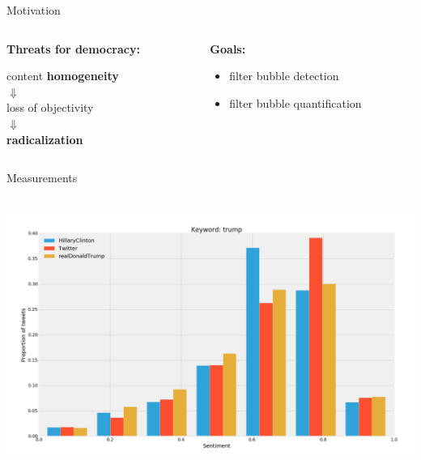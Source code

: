 \documentclass{beamer}
\begin{document}
\begin{frame}[fragile]
\begin{columns}[T]
\begin{column}{.63\textwidth}
\begin{customalertblock}{Motivation}
    \begin{columns}
        \begin{column}{.5\textwidth}
            \begin{large}\textbf{Threats for democracy:}\end{large}
            \vspace{0.5cm}
            \center
            content \textbf{homogeneity}\\
            $\Downarrow$\\
            loss of objectivity\\
            $\Downarrow$\\
            \textbf{radicalization}
        \end{column}
        \begin{column}{.5\textwidth}
            \begin{large}\textbf{Goals:}\end{large}
            \vspace{0.5cm}
            \begin{itemize}
                \item filter bubble detection
                \item filter bubble quantification
            \end{itemize}
        \end{column}
    \end{columns}
\end{customalertblock}
\begin{block}{Measurements}
    \begin{columns}
            \includegraphics[scale=0.585]{./Pics/hist-trump.png}

\end{columns}
\end{block}
\end{column}
\end{columns}
\end{frame}
\end{document}
